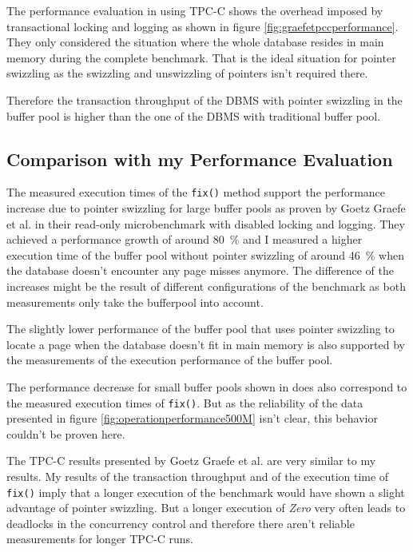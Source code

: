     The performance evaluation in \cite{Graefe:2014} using TPC-C shows the overhead imposed by transactional locking and logging as shown in figure \ref{fig:graefetpccperformance}. They only considered the situation where the whole database resides in main memory during the complete benchmark. That is the ideal situation for pointer swizzling as the swizzling and unswizzling of pointers isn't required there.

    Therefore the transaction throughput of the DBMS with pointer swizzling in the buffer pool is higher than the one of the DBMS with traditional buffer pool.

\subsection{Comparison with my Performance Evaluation}

    The measured execution times of the \lstinline{fix()} method support the performance increase due to pointer swizzling for large buffer pools as proven by Goetz Graefe et al. in their read-only microbenchmark with disabled locking and logging. They achieved a performance growth of around \SI{80}{\percent} and I measured a higher execution time of the buffer pool without pointer swizzling of around \SI{46}{\percent} when the database doesn't encounter any page misses anymore. The difference of the increases might be the result of different configurations of the benchmark as both measurements only take the bufferpool into account.

    The slightly lower performance of the buffer pool that uses pointer swizzling to locate a page when the database doesn't fit in main memory is also supported by the measurements of the execution performance of the buffer pool.

    The performance decrease for small buffer pools shown in \cite{Graefe:2014} does also correspond to the measured execution times of \lstinline{fix()}. But as the reliability of the data presented in figure \ref{fig:operationperformance500M} isn't clear, this behavior couldn't be proven here.

    The TPC-C results presented by Goetz Graefe et al. are very similar to my results. My results of the transaction throughput and of the execution time of \lstinline{fix()} imply that a longer execution of the benchmark would have shown a slight advantage of pointer swizzling. But a longer execution of \emph{Zero} very often leads to deadlocks in the concurrency control and therefore there aren't reliable measurements for longer TPC-C runs.

